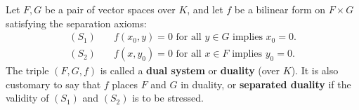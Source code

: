 Let $F, G$ be a pair of vector spaces over $K$, and let $f$ be a bilinear form on $F \times G$ satisfying the separation axioms:
$$
\begin{aligned}
(S_1) &\quad f(x_0, y) = 0 \text{ for all } y \in G \text{ implies } x_0 = 0. \\
(S_2) &\quad f(x, y_0) = 0 \text{ for all } x \in F \text{ implies } y_0 = 0.
\end{aligned}
$$
The triple $(F, G, f)$ is called a \textbf{dual system} or \textbf{duality} (over $K$). It is also customary to say that $f$ places $F$ and $G$ in duality, or \textbf{separated duality} if the validity of $(S_1)$ and $(S_2)$ is to be stressed.
